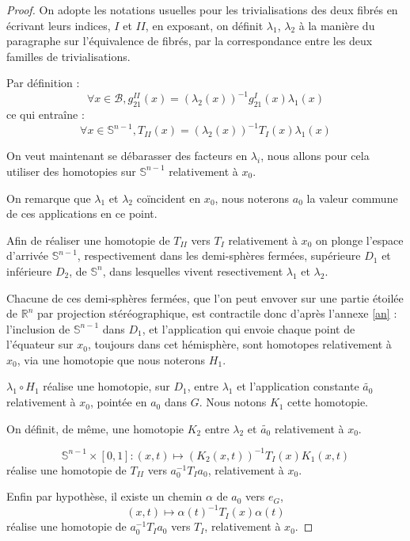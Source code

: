 
\begin{proof}
On adopte les notations usuelles pour les trivialisations des deux fibrés en écrivant leurs indices, $I$ et $II$, en exposant, %
on définit $\lambda_1$, $\lambda_2$ à la manière du paragraphe sur l'équivalence de fibrés, par la correspondance entre les deux familles de trivialisations.

\par
Par définition :
\[\forall x \in \mathcal{B} , g_{21}^{II}(x) = (\lambda_2(x))^{-1} g_{21}^I(x) \lambda_1(x)\]
ce qui entraîne :
\[\forall x \in \mathbb{S}^{n-1} , T_{II}(x) = (\lambda_2(x))^{-1} T_I(x) \lambda_1(x)\]

\etoile
On veut maintenant se débarasser des facteurs en $\lambda_i$, nous allons pour cela utiliser des homotopies sur $\mathbb{S}^{n-1}$ relativement à $x_0$.

\par
On remarque que $\lambda_1$ et $\lambda_2$ coïncident en $x_0$, nous noterons $a_0$ la valeur commune de ces applications en ce point.

\par
Afin de réaliser une homotopie de $T_{II}$ vers $T_I$ relativement à $x_0$ on plonge l'espace d'arrivée $\mathbb{S}^{n-1}$, %
respectivement dans les demi-sphères fermées, supérieure $D_1$ et inférieure $D_2$, de $\mathbb{S}^n$, %
dans lesquelles vivent resectivement $\lambda_1$ et $\lambda_2$.

\par
Chacune de ces demi-sphères fermées, que l'on peut envover sur une partie étoilée de $\mathbb{R}^n$ par projection stéréographique, %
est contractile donc d'après l'annexe \ref{an} : l'inclusion de $\mathbb{S}^{n-1}$ dans $D_1$, %
et l'application qui envoie chaque point de l'équateur sur $x_0$, toujours dans cet hémisphère, %
sont homotopes relativement à $x_0$, via une homotopie que nous noterons $H_1$.

\par
$\lambda_1 \circ H_1$ réalise une homotopie, sur $D_1$, entre $\lambda_1$ et l'application constante $\tilde{a_0}$ relativement à $x_0$, %
pointée en $a_0$ dans $G$. Nous notons $K_1$ cette homotopie.

\par
On définit, de même, une homotopie $K_2$ entre $\lambda_2$ et $\tilde{a_0}$ relativement à $x_0$.

\[\mathbb{S}^{n-1} \times [0,1] : (x,t) \mapsto (K_2(x,t))^{-1} T_I(x) K_1(x,t)\]
réalise une homotopie de $T_{II}$ vers $a_0^{-1} T_I a_0$, relativement à $x_0$.

\par
Enfin par hypothèse, il existe un chemin $\alpha$ de $a_0$ vers $e_G$,
\[(x,t) \mapsto \alpha(t)^{-1} T_I(x) \alpha(t)\]
réalise une homotopie de $a_0^{-1} T_I a_0$ vers $T_I$, relativement à $x_0$.
\end{proof}

